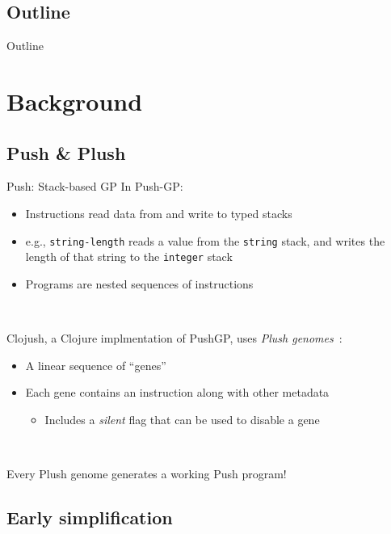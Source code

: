 \documentclass{beamer}
\begin{document}
\subsection*{Outline}

\begin{frame}{Outline}
  \tableofcontents[hideallsubsections]
\end{frame}


\section{Background}

\subsection{Push \& Plush}

\begin{frame}{Push: Stack-based GP}
In Push-GP:
\begin{itemize}
	\item Instructions read data from and write to typed stacks
	\item e.g., \texttt{string-length} reads a value from the \texttt{string} stack, and writes the length of that string to the \texttt{integer} stack
	\item Programs are nested sequences of instructions
\end{itemize}

~

Clojush, a Clojure implmentation of PushGP, uses \emph{Plush genomes}~\cite{Helmuth:2016:GPTP}:
\begin{itemize}
	\item A linear sequence of ``genes''
	\item Each gene contains an instruction along with other metadata
	\begin{itemize}
		\item Includes a \emph{silent} flag that can be used to disable a gene
	\end{itemize}
\end{itemize}

~

Every Plush genome generates a working Push program!

\end{frame}

\subsection{Early simplification}
\end{document}
